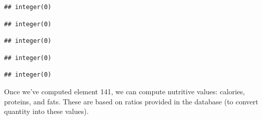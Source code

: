 \documentclass[nojss]{jss}
\begin{document}
\begin{knitrout}
\begin{kframe}
\begin{verbatim}
## integer(0)
\end{verbatim}
\begin{alltt}
\hlstd{(} \hlstd{=} \hlstd{,}  
                 
\end{alltt}
\begin{verbatim}
## integer(0)
\end{verbatim}
\begin{alltt}
\hlstd{(}   
\end{alltt}
\begin{verbatim}
## integer(0)
\end{verbatim}
\begin{alltt}
\hlstd{(}   
\end{alltt}
\begin{verbatim}
## integer(0)
\end{verbatim}
\begin{alltt}
\hlstd{(} \hlstd{=} \hlstd{,}
                                    
                                    
\end{alltt}
\begin{verbatim}
## integer(0)
\end{verbatim}
\end{kframe}
\end{knitrout}

Once we've computed element 141, we can compute nutritive values: calories,
proteins, and fats.  These are based on ratios provided in the database (to
convert quantity into these values).
\end{document}
